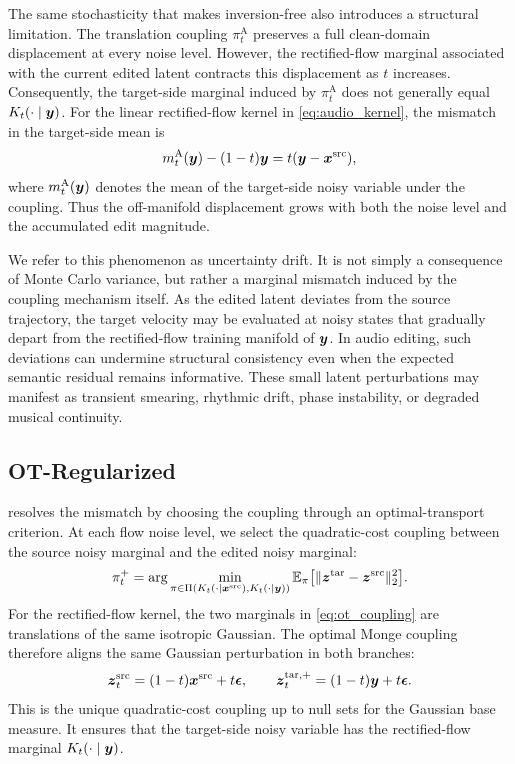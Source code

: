 The same stochasticity that makes \method inversion-free also introduces a structural limitation.
The translation coupling $\pi_t^{\mathrm{A}}$ preserves a full clean-domain displacement at every noise level.
However, the rectified-flow marginal associated with the current edited latent contracts this displacement as $t$ increases.
Consequently, the target-side marginal induced by $\pi_t^{\mathrm{A}}$ does not generally equal $K_t(\cdot\mid\boldsymbol{y})$.
For the linear rectified-flow kernel in \eqref{eq:audio_kernel}, the mismatch in the target-side mean is
\begin{equation}
    \label{eq:audioedit_mismatch}
    m_t^{\mathrm{A}}(\boldsymbol{y})-(1-t)\boldsymbol{y}
    =
    t(\boldsymbol{y}-\boldsymbol{x}^{\mathrm{src}}),
\end{equation}
where $m_t^{\mathrm{A}}(\boldsymbol{y})$ denotes the mean of the target-side noisy variable under the \method coupling.
Thus the off-manifold displacement grows with both the noise level and the accumulated edit magnitude.

We refer to this phenomenon as uncertainty drift.
It is not simply a consequence of Monte Carlo variance, but rather a marginal mismatch induced by the coupling mechanism itself.
As the edited latent deviates from the source trajectory, the target velocity may be evaluated at noisy states that gradually depart from the rectified-flow training manifold of $\boldsymbol{y}$.
In audio editing, such deviations can undermine structural consistency even when the expected semantic residual remains informative.
These small latent perturbations may manifest as transient smearing, rhythmic drift, phase instability, or degraded musical continuity.

\subsection{OT-Regularized \methodplus}

\methodplus resolves the mismatch by choosing the coupling through an optimal-transport criterion.
At each flow noise level, we select the quadratic-cost coupling between the source noisy marginal and the edited noisy marginal:
\begin{equation}
    \label{eq:ot_coupling}
    \begin{aligned}
    \pi_t^{+}
    =
    \arg\min_{\pi\in
    \Pi\left(
    K_t(\cdot\mid \boldsymbol{x}^{\mathrm{src}}),
    K_t(\cdot\mid \boldsymbol{y})
    \right)}
    \mathbb{E}_{\pi}\big[
    \|\boldsymbol{z}^{\mathrm{tar}}-\boldsymbol{z}^{\mathrm{src}}\|_2^2
    \big].
    \end{aligned}
\end{equation}
For the rectified-flow kernel, the two marginals in \eqref{eq:ot_coupling} are translations of the same isotropic Gaussian.
The optimal Monge coupling therefore aligns the same Gaussian perturbation in both branches:
\begin{equation}
    \label{eq:ot_monge}
    \boldsymbol{z}^{\mathrm{src}}_t=(1-t)\boldsymbol{x}^{\mathrm{src}}+t\boldsymbol{\epsilon},
    \qquad
    \boldsymbol{z}^{\mathrm{tar},+}_t=(1-t)\boldsymbol{y}+t\boldsymbol{\epsilon}.
\end{equation}
This is the unique quadratic-cost coupling up to null sets for the Gaussian base measure.
It ensures that the target-side noisy variable has the rectified-flow marginal $K_t(\cdot\mid\boldsymbol{y})$.

